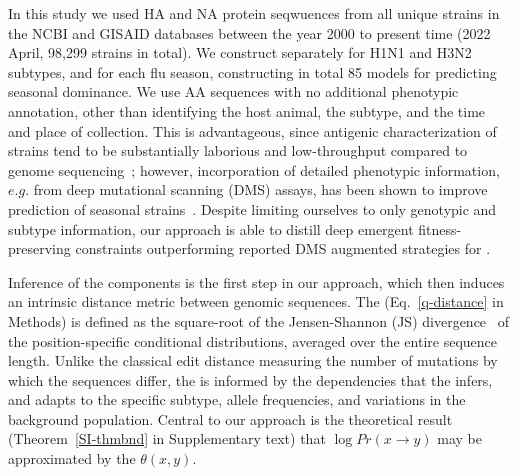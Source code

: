 \documentclass[onecolumn, compsoc,10pt]{IEEEtran}
\begin{document}
In this study we used  HA and NA protein seqwuences from  all unique \infl strains in the NCBI and GISAID databases between the year 2000 to present time (2022 April,  98,299 strains in total). We  construct  separately for H1N1 and H3N2 subtypes, and for each flu season, constructing in total 85 models for predicting seasonal dominance. %
We  use AA sequences with no additional phenotypic annotation, other than identifying the host animal, the subtype, and the time and place of collection. This is advantageous, since antigenic characterization of  \infl strains tend to be substantially  laborious and low-throughput compared to genome sequencing~\cite{wood2012reproducibility}; however,  incorporation of detailed phenotypic information, $e.g.$ from deep mutational scanning (DMS) assays, has been shown to improve prediction of seasonal strains~\cite{huddleston2020integrating}. Despite limiting ourselves to only genotypic and subtype information, our approach is able to distill deep emergent  fitness-preserving constraints   outperforming reported DMS  augmented strategies for \infl.

 
Inference of the \enet components is the first step in our approach, which then induces  an intrinsic distance metric between genomic sequences. The \qdist  (Eq.~\eqref{q-distance} in Methods) is defined as the square-root of the Jensen-Shannon (JS) divergence~\cite{cover} of the position-specific conditional distributions, averaged over the entire sequence length. Unlike the classical edit distance measuring the number of mutations by which the sequences differ, the \qdist is informed by the   dependencies that the \enet infers, and adapts to the specific subtype, allele frequencies, and variations in the background population. Central to our approach is the theoretical result (Theorem~\ref{SI-thmbnd} in Supplementary text) that   $\log Pr(x \rightarrow y )$   may be approximated by the  \qdist $\theta(x,y)$.
%
\end{document}
